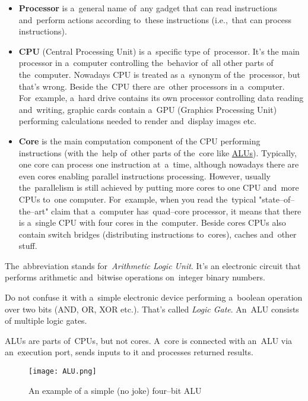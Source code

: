 \label{processorcpucore}
\begin{itemize}
    \item \textbf{Processor} is a~general name of~any gadget that can read instructions and~perform actions according to~these instructions (i.e.,~that can process instructions).
    \item \textbf{CPU} (Central Processing Unit) is a~specific type of~processor. It's the main processor in a~computer controlling the~behavior of~all other parts of the~computer. Nowadays CPU is treated as a~synonym of the~processor, but that's wrong. Beside the~CPU there are~other processors in a~computer. For~example, a~hard drive contains its own processor controlling data reading and~writing, graphic cards contain a~GPU (Graphics Processing Unit) performing calculations needed to render and~display images etc.
    \item \textbf{Core} is the main computation component of the CPU performing instructions (with the~help of~other parts of the~core like \hyperref[alu]{ALUs}). Typically, one core can process one instruction at~a~time, although nowadays there are even cores enabling parallel instructions processing. However, usually the~parallelism is still achieved by putting more cores to one CPU and~more CPUs to~one computer. For~example, when you read the~typical "state--of--the--art" claim that a~computer has~quad--core processor, it means that there is a~single CPU with four cores in the~computer. Beside cores CPUs also contain switch bridges (distributing instructions to~cores), caches and~other stuff.
\end{itemize}

\label{alu}
The~abbreviation stands for~\textit{Arithmetic Logic Unit}. It's an electronic circuit that performs arithmetic and~bitwise operations on~integer binary numbers.

\warning Do not confuse it with a~simple electronic device performing a~boolean operation over two bits (AND, OR, XOR etc.). That's called \textit{Logic Gate}. An~ALU consists of multiple logic gates.

\warning ALUs are parts of~CPUs, but not cores. A~core is connected with an~ALU via an~execution port, sends inputs to it and processes returned results.

\begin{figure}
    \centering
    \texttt{[image: ALU.png]}
    \caption*{An example of a simple (no joke) four--bit ALU}
\end{figure}
\newpage


